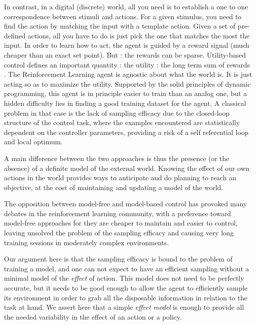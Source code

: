 \documentclass[runningheads]{llncs}
\begin{document}
In contrast, in a digital (discrete) world, all you
need is to establish a one to one correspondence between stimuli and actions. For a given stimulus, you need to find the action by
matching the input with a template action. Given a set of pre-defined actions, all you have to do is just pick the one that matches the most the input.  
In order to learn how to act, the agent is guided by a reward signal (much cheaper than an exact set point).
But : the rewards can be sparse.
Utility-based control defines an important quantity : the utility : the long term sum of rewards \cite{sutton2018reinforcement}.
The Reinforcement Learning agent is agnostic about what the world is. It is just acting so as to maximize the utility.
Supported by the solid principles of dynamic programming, this agent is in principle easier to train than an analog one, but
a hidden difficulty lies in finding a good training dataset for the agent. A classical problem in that case is the lack of sampling efficacy due to the closed-loop structure of the control task, where the examples encountered are statistically dependent on the controller parameters, 
providing a risk of a self referential loop and local optimum.

A main difference between the two approaches is thus the presence (or the absence) of a definite model of the external world.   Knowing the effect of our own actions in the world provides ways to anticipate and do planning to reach an objective, at the cost of maintaining and updating a model of the world. 

The opposition between model-free and model-based control has provoked many debates in the reinforcement learning community, with a preference toward model-free approaches for they are cheaper to maintain and easier to control, leaving unsolved the problem of the sampling efficacy and causing very long training sessions in moderately complex environments.
 
Our argument here is that the sampling efficacy is bound to the problem of training a model, and one can not expect to have an efficient sampling without a minimal model of the \emph{effect} of action. This model does not need to be perfectly accurate, but it needs to be good enough to allow the agent to efficiently sample its environment in order to grab all the disposable information in relation to the task at hand. We assert here that a simple \emph{effect model} is enough to provide all the needed variability in the effect of an action or a policy. 
\end{document}
